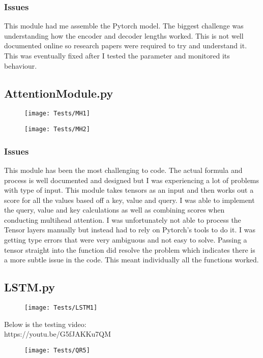 \documentclass{article}
\begin{document}
\subsubsection{Issues}
This module had me assemble the Pytorch model. The biggest challenge was understanding
how the encoder and decoder lengths worked. This is not well documented online
so research papers were required to try and understand it. This was eventually fixed
after I tested the parameter and monitored its behaviour.
\subsection{AttentionModule.py}

\begin{figure}[H]
    \centering
    \texttt{[image: Tests/MH1]}
\end{figure}
\begin{figure}[H]
    \centering
    \texttt{[image: Tests/MH2]}
\end{figure}
\subsubsection{Issues}
This module has been the most challenging to code. The actual formula and process
is well documented and designed but I was experiencing a lot of problems with
type of input. This module takes tensors as an input and then works out a score
for all the values based off a key, value and query. I was able to implement the
query, value and key calculations as well as combining scores when conducting
multihead attention. I was unfortunately not able to process the Tensor layers
manually but instead had to rely on Pytorch's tools to do it. I was getting
type errors that were very ambiguous and not easy to solve. Passing a tensor
straight into the function did resolve the problem which indicates there is
a more subtle issue in the code. This meant individually all the functions worked.

\subsection{LSTM.py}
\begin{figure}[H]
    \centering
    \texttt{[image: Tests/LSTM1]}
\end{figure}
Below is the testing video:
\\https://youtu.be/G5fJAKKu7QM
\begin{figure}[H]
    \centering
    \texttt{[image: Tests/QR5]}
\end{figure}
\end{document}
